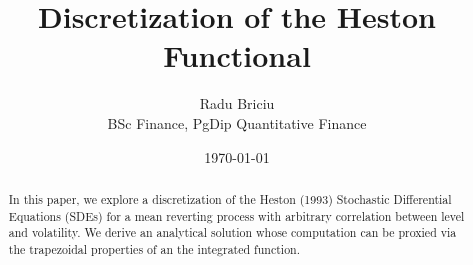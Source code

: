 \documentclass[letterpaper,11pt]{article}
\title{\textbf{Discretization of the Heston Functional}}
\author{\small Radu Briciu \vspace{-0.5em}  \\ \tiny BSc Finance, PgDip Quantitative Finance}
\date{\today}
\begin{document}
	
	\begin{titlepage}
		\maketitle
		\vfill
		\begin{abstract}
			In this paper, we explore a discretization of the Heston (1993) Stochastic Differential Equations (SDEs) for a mean reverting process with arbitrary correlation between level and volatility. We derive an analytical solution whose computation can be proxied via the trapezoidal properties of an the integrated function.
		\end{abstract}
		\vfill
	\end{titlepage}
	
	
	
%	
	
\end{document}
